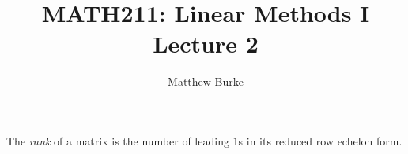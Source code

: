 \message{ !name(2018-09-11slides.tex)}\documentclass{beamer}
\title{MATH211: Linear Methods I\\Lecture 2}
\author{Matthew Burke}
\date{\formatdate{11}{09}{2018}}
\begin{document}
\begin{definition}
    The \emph{rank} of a matrix is the number of leading $1$s in its reduced row echelon form.
  \end{definition}
\end{document}

